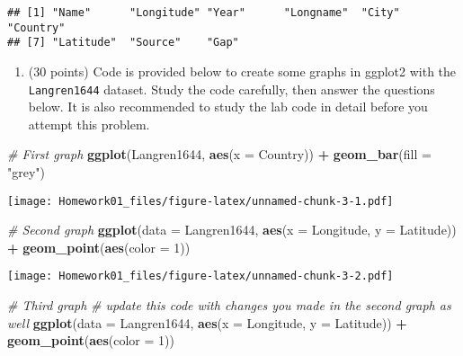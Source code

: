 \documentclass[]{article}
\newenvironment{Shaded}{\begin{snugshade}}{\end{snugshade}}
\newcommand{\CommentTok}[1]{\textcolor[rgb]{0.56,0.35,0.01}{\textit{#1}}}
\newcommand{\DataTypeTok}[1]{\textcolor[rgb]{0.13,0.29,0.53}{#1}}
\newcommand{\DecValTok}[1]{\textcolor[rgb]{0.00,0.00,0.81}{#1}}
\newcommand{\KeywordTok}[1]{\textcolor[rgb]{0.13,0.29,0.53}{\textbf{#1}}}
\newcommand{\NormalTok}[1]{#1}
\newcommand{\OperatorTok}[1]{\textcolor[rgb]{0.81,0.36,0.00}{\textbf{#1}}}
\newcommand{\StringTok}[1]{\textcolor[rgb]{0.31,0.60,0.02}{#1}}
\providecommand{\tightlist}{%
  \setlength{\itemsep}{0pt}\setlength{\parskip}{0pt}}
\begin{document}
\begin{verbatim}
## [1] "Name"      "Longitude" "Year"      "Longname"  "City"      "Country"  
## [7] "Latitude"  "Source"    "Gap"
\end{verbatim}

\begin{enumerate}
\def\labelenumi{\alph{enumi}.}
\setcounter{enumi}{4}
\tightlist
\item
  (30 points) Code is provided below to create some graphs in ggplot2
  with the \texttt{Langren1644} dataset. Study the code carefully, then
  answer the questions below. It is also recommended to study the lab
  code in detail before you attempt this problem.
\end{enumerate}

\begin{Shaded}
\begin{Highlighting}[]
\CommentTok{# First graph}
\KeywordTok{ggplot}\NormalTok{(Langren1644, }\KeywordTok{aes}\NormalTok{(}\DataTypeTok{x =}\NormalTok{ Country)) }\OperatorTok{+}
\StringTok{  }\KeywordTok{geom_bar}\NormalTok{(}\DataTypeTok{fill =} \StringTok{"grey"}\NormalTok{) }
\end{Highlighting}
\end{Shaded}

\texttt{[image: Homework01\_files/figure-latex/unnamed-chunk-3-1.pdf]}

\begin{Shaded}
\begin{Highlighting}[]
\CommentTok{# Second graph}
\KeywordTok{ggplot}\NormalTok{(}\DataTypeTok{data =}\NormalTok{ Langren1644, }\KeywordTok{aes}\NormalTok{(}\DataTypeTok{x =}\NormalTok{ Longitude, }\DataTypeTok{y =}\NormalTok{ Latitude)) }\OperatorTok{+}\StringTok{ }
\StringTok{  }\KeywordTok{geom_point}\NormalTok{(}\KeywordTok{aes}\NormalTok{(}\DataTypeTok{color =} \DecValTok{1}\NormalTok{))}
\end{Highlighting}
\end{Shaded}

\texttt{[image: Homework01\_files/figure-latex/unnamed-chunk-3-2.pdf]}

\begin{Shaded}
\begin{Highlighting}[]
\CommentTok{# Third graph}
\CommentTok{# update this code with changes you made in the second graph as well}
\KeywordTok{ggplot}\NormalTok{(}\DataTypeTok{data =}\NormalTok{ Langren1644, }\KeywordTok{aes}\NormalTok{(}\DataTypeTok{x =}\NormalTok{ Longitude, }\DataTypeTok{y =}\NormalTok{ Latitude)) }\OperatorTok{+}\StringTok{ }
\StringTok{  }\KeywordTok{geom_point}\NormalTok{(}\KeywordTok{aes}\NormalTok{(}\DataTypeTok{color =} \DecValTok{1}\NormalTok{))}
\end{Highlighting}
\end{Shaded}
\end{document}
